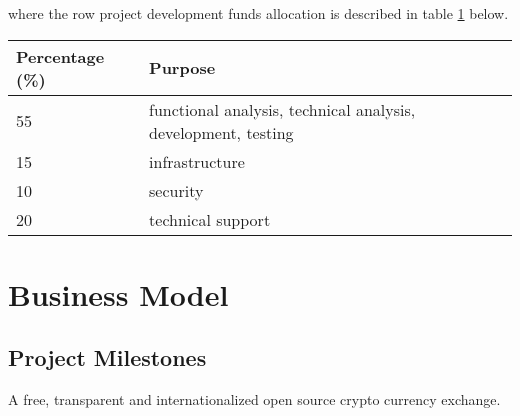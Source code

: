 \documentclass[11pt,fleqn,oneside]{book} %
\begin{document}
\vspace{5mm}
where the row project development funds allocation is described in table \ref{tab:focus} below.

\vspace{5mm}
\begin{table}[H]
	\centering
	\begin{tabular}{l l}
		\toprule
		\textbf{Percentage (\%)} & \textbf{Purpose} \\
		\midrule
		55		& functional analysis, technical analysis, development, testing	\\
		15		& infrastructure	\\
		10		& security	\\
		20		& technical support	\\
		\bottomrule
	\end{tabular}
	\label{tab:focus}
\end{table}



\chapter{Business Model}

\section{Project Milestones}
A free, transparent and internationalized open source crypto currency exchange.\\
\end{document}
